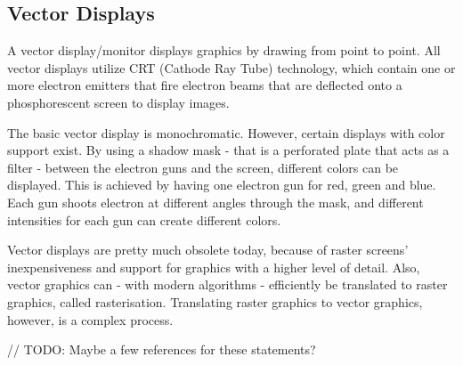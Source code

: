 \subsection{Vector Displays}
A vector display/monitor displays graphics by drawing from point to point. 
All vector displays utilize CRT (Cathode Ray Tube) technology, which contain one or more electron emitters that fire electron beams that are deflected onto a phosphorescent screen to display images.

The basic vector display is monochromatic. 
However, certain displays with color support exist. 
By using a shadow mask - that is a perforated plate that acts as a filter - between the electron guns and the screen, different colors can be displayed. This is achieved by having one electron gun for red, green and blue. Each gun shoots electron at different angles through the mask, and different intensities for each gun can create different colors.

Vector displays are pretty much obsolete today, because of raster screens' inexpensiveness and support for graphics with a higher level of detail. 
Also, vector graphics can - with modern algorithms - efficiently be translated to raster graphics, called rasterisation.
Translating raster graphics to vector graphics, however, is a complex process.

// TODO: Maybe a few references for these statements?